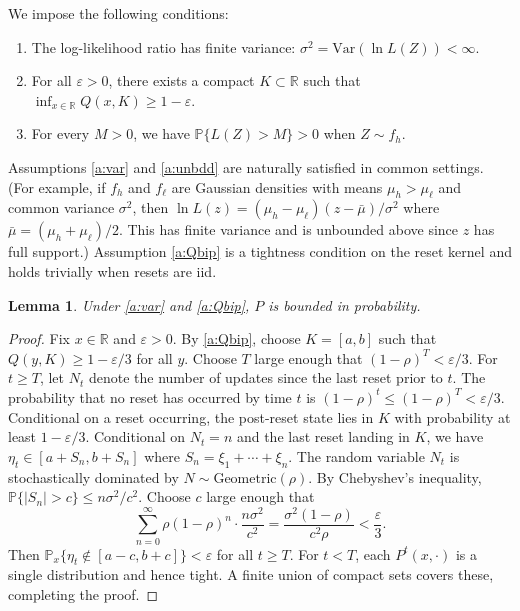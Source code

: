 \documentclass[12pt,reqno]{amsart}
\numberwithin{equation}{section}
\newtheorem{lemma}{Lemma}[section]
\theoremstyle{definition}
\newcommand{\1}{\mathbbm{1}}
\newcommand{\RR}{\mathbb{R}}
\newcommand{\PP}{\mathbb P}
\begin{document}
We impose the following conditions:
%
\begin{enumerate}[label=(A\arabic*)]
    \item \label{a:var} The log-likelihood ratio has finite variance:
        $\sigma^2 = \mathrm{Var}(\ln L(Z)) < \infty$.
    \item \label{a:Qbip} For all $\varepsilon > 0$, there exists a compact $K \subset \RR$ such that
        $\inf_{x \in \RR} Q(x, K) \geq 1 - \varepsilon$.
    \item \label{a:unbdd} For every $M > 0$, we have $\PP\{L(Z) > M\} > 0$ when $Z \sim f_h$.
\end{enumerate}
%
Assumptions \ref{a:var} and \ref{a:unbdd} are naturally satisfied in common
settings. (For example, if $f_h$ and $f_\ell$ are Gaussian densities
with means $\mu_h > \mu_\ell$ and common variance $\sigma^2$, then $\ln L(z) =
(\mu_h - \mu_\ell)(z - \bar \mu)/\sigma^2$ where $\bar \mu = (\mu_h +
\mu_\ell)/2$. This has finite variance and is unbounded above since $z$ has full
support.) Assumption \ref{a:Qbip} is a tightness condition on the reset kernel and holds trivially when resets are {\sc iid}.

\begin{lemma}\label{l:bshock-bip}
    Under {\rm \ref{a:var}} and {\rm \ref{a:Qbip}}, $P$ is bounded in probability.
\end{lemma}

\begin{proof}
    Fix $x \in \RR$ and $\varepsilon > 0$. By \ref{a:Qbip}, choose $K = [a, b]$ such that
    $Q(y, K) \geq 1 - \varepsilon/3$ for all $y$.
    Choose $T$ large enough that $(1-\rho)^T < \varepsilon/3$.
    For $t \geq T$, let $N_t$ denote the number of updates since the
    last reset prior to $t$. The probability that no reset has occurred by time
    $t$ is $(1 - \rho)^t \leq (1-\rho)^T < \varepsilon/3$.
    Conditional on a reset occurring, the post-reset
    state lies in $K$ with probability at least $1 - \varepsilon/3$. Conditional
    on $N_t = n$ and the last reset landing in $K$, we have $\eta_t \in [a +
    S_n, b + S_n]$ where $S_n = \xi_1 + \cdots + \xi_n$. The random variable
    $N_t$ is stochastically dominated by $N \sim \mathrm{Geometric}(\rho)$. By
    Chebyshev's inequality, $\PP\{|S_n| > c\} \leq n\sigma^2/c^2$. Choose $c$
    large enough that
    \begin{equation*}
        \sum_{n=0}^{\infty} \rho(1-\rho)^n \cdot \frac{n\sigma^2}{c^2}
        = \frac{\sigma^2(1-\rho)}{c^2 \rho} < \frac{\varepsilon}{3}.
    \end{equation*}
    Then $\PP_x\{\eta_t \notin [a-c, b+c]\} < \varepsilon$ for all $t \geq T$.
    For $t < T$, each $P^t(x, \cdot)$ is a single distribution and hence tight.
    A finite union of compact sets covers these, completing the proof.
\end{proof}
\end{document}
